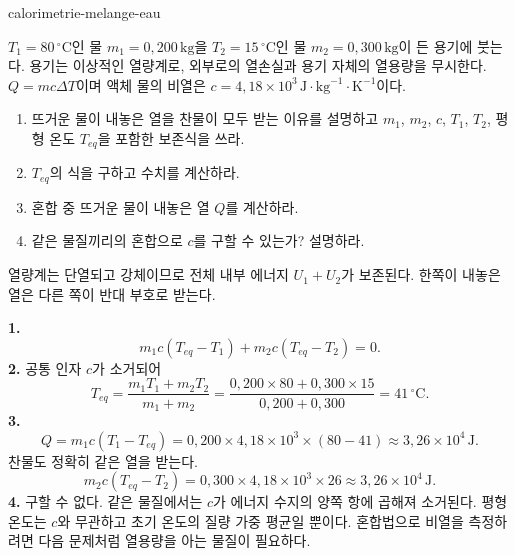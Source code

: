 \begin{exo}[두 물 질량의 혼합]{calorimetrie-melange-eau}

$T_1=80\,^\circ\text{C}$인 물 $m_1=0{,}200\,\text{kg}$을 $T_2=15\,^\circ\text{C}$인 물 $m_2=0{,}300\,\text{kg}$이 든 용기에 붓는다. 용기는 이상적인 열량계로, 외부로의 열손실과 용기 자체의 열용량을 무시한다. $Q=mc\Delta T$이며 액체 물의 비열은 $c=4{,}18\times10^3\,\text{J}\!\cdot\!\text{kg}^{-1}\!\cdot\!\text{K}^{-1}$이다.
\begin{enumerate}
  \item 뜨거운 물이 내놓은 열을 찬물이 모두 받는 이유를 설명하고 $m_1$, $m_2$, $c$, $T_1$, $T_2$, 평형 온도 $T_{eq}$을 포함한 보존식을 쓰라.
  \item $T_{eq}$의 식을 구하고 수치를 계산하라.
  \item 혼합 중 뜨거운 물이 내놓은 열 $Q$를 계산하라.
  \item 같은 물질끼리의 혼합으로 $c$를 구할 수 있는가? 설명하라.
\end{enumerate}
\begin{indication}
열량계는 단열되고 강체이므로 전체 내부 에너지 $U_1+U_2$가 보존된다. 한쪽이 내놓은 열은 다른 쪽이 반대 부호로 받는다.
\end{indication}
\begin{solution}
\textbf{1.}
\[
m_1c(T_{eq}-T_1)+m_2c(T_{eq}-T_2)=0.
\]
\textbf{2.} 공통 인자 $c$가 소거되어
\[
T_{eq}=\frac{m_1T_1+m_2T_2}{m_1+m_2}
=\frac{0{,}200\times80+0{,}300\times15}{0{,}200+0{,}300}=41\,^\circ\text{C}.
\]
\textbf{3.}
\[
Q=m_1c(T_1-T_{eq})=0{,}200\times4{,}18\times10^3\times(80-41)
\approx3{,}26\times10^4\,\text{J}.
\]
찬물도 정확히 같은 열을 받는다.
\[
m_2c(T_{eq}-T_2)=0{,}300\times4{,}18\times10^3\times26
\approx3{,}26\times10^4\,\text{J}.
\]
\textbf{4.} 구할 수 없다. 같은 물질에서는 $c$가 에너지 수지의 양쪽 항에 곱해져 소거된다. 평형 온도는 $c$와 무관하고 초기 온도의 질량 가중 평균일 뿐이다. 혼합법으로 비열을 측정하려면 다음 문제처럼 열용량을 아는 물질이 필요하다.
\end{solution}
\end{exo}

